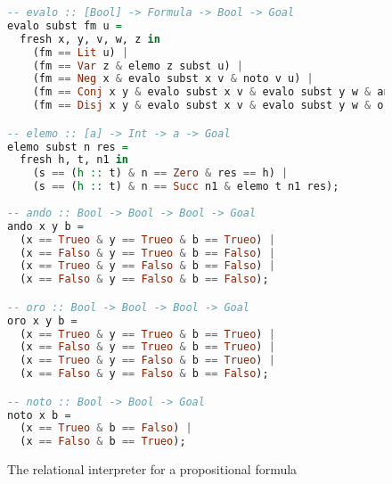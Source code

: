 \begin{figure}[h!]
  \begin{lstlisting}[language=Haskell, basicstyle=\small]
-- evalo :: [Bool] -> Formula -> Bool -> Goal
evalo subst fm u =
  fresh x, y, v, w, z in
    (fm == Lit u) |
    (fm == Var z & elemo z subst u) |
    (fm == Neg x & evalo subst x v & noto v u) |
    (fm == Conj x y & evalo subst x v & evalo subst y w & ando v w u) | 
    (fm == Disj x y & evalo subst x v & evalo subst y w & oro v w u);

-- elemo :: [a] -> Int -> a -> Goal 
elemo subst n res = 
  fresh h, t, n1 in 
    (s == (h :: t) & n == Zero & res == h) | 
    (s == (h :: t) & n == Succ n1 & elemo t n1 res); 
    
-- ando :: Bool -> Bool -> Bool -> Goal 
ando x y b =
  (x == Trueo & y == Trueo & b == Trueo) |
  (x == Falso & y == Trueo & b == Falso) |
  (x == Trueo & y == Falso & b == Falso) |
  (x == Falso & y == Falso & b == Falso);

-- oro :: Bool -> Bool -> Bool -> Goal 
oro x y b =
  (x == Trueo & y == Trueo & b == Trueo) |
  (x == Falso & y == Trueo & b == Trueo) |
  (x == Trueo & y == Falso & b == Trueo) |
  (x == Falso & y == Falso & b == Falso);

-- noto :: Bool -> Bool -> Goal 
noto x b =
  (x == Trueo & b == Falso) |
  (x == Falso & b == Trueo);
  \end{lstlisting}
  \caption{The relational interpreter for a propositional formula}
  \label{fig:chap1:propRel}
\end{figure}